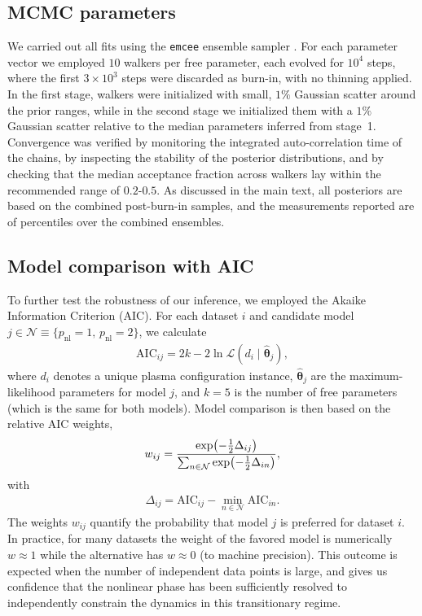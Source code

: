 

\subsection{MCMC parameters}
\label{app:ssd-nl:mcmc}

    We carried out all fits using the \texttt{emcee} ensemble sampler \citep{Foreman-Mackey13a}. For each parameter vector we employed $10$ walkers per free parameter, each evolved for $10^4$ steps, where the first $3\times 10^3$ steps were discarded as burn-in, with no thinning applied. In the first stage, walkers were initialized with small, $1\%$ Gaussian scatter around the prior ranges, while in the second stage we initialized them with a $1\%$ Gaussian scatter relative to the median parameters inferred from stage~1. Convergence was verified by monitoring the integrated auto-correlation time of the chains, by inspecting the stability of the posterior distributions, and by checking that the median acceptance fraction across walkers lay within the recommended range of $0.2$-$0.5$. As discussed in the main text, all posteriors are based on the combined post-burn-in samples, and the measurements reported are of percentiles over the combined ensembles.

\subsection{Model comparison with AIC}
\label{app:ssd-nl:aic}

    To further test the robustness of our inference, we employed the Akaike Information Criterion (AIC). For each dataset $i$ and candidate model \mbox{$j \in \mathcal{N} \equiv \{p_\mathrm{nl}=1, \,p_\mathrm{nl}=2\}$}, we calculate
    \begin{align}
        \mathrm{AIC}_{ij}
            = 2k - 2\ln \mathcal{L}(d_i \mid \bm{\hat{\theta}}_j) ,
    \end{align}
    where $d_i$ denotes a unique plasma configuration instance, $\bm{\hat{\theta}}_j$ are the maximum-likelihood parameters for model $j$, and $k = 5$ is the number of free parameters (which is the same for both models). Model comparison is then based on the relative AIC weights,
    \begin{align}
        w_{ij}
            = \frac{
                \exp\!\left( -\tfrac{1}{2} \Delta_{ij} \right)
            }{
                \sum_{n \in \mathcal{N}} \exp\!\left( -\tfrac{1}{2} \Delta_{in} \right)
            } ,
    \end{align}
    with
    \begin{align}
        \Delta_{ij}
            = \mathrm{AIC}_{ij} - \min_{n \in \mathcal{N}} \mathrm{AIC}_{in} .
    \end{align}
    The weights $w_{ij}$ quantify the probability that model $j$ is preferred for dataset $i$. In practice, for many datasets the weight of the favored model is numerically $w \approx 1$ while the alternative has $w \approx 0$ (to machine precision). This outcome is expected when the number of independent data points is large, and gives us confidence that the nonlinear phase has been sufficiently resolved to independently constrain the dynamics in this transitionary regime.

